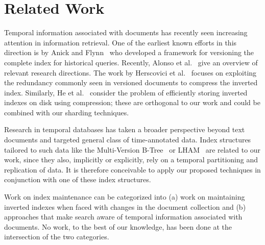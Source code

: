 

\section{Related Work}
\label{chap:sharding:sec:related}

Temporal information associated with documents has recently seen
increasing attention in information retrieval. One of the earliest
known efforts in this direction is by Anick and
Flynn~\cite{DBLP:conf/sigir/AnickF92} who developed a framework for
versioning the complete index for historical queries. Recently, Alonso
et al.~\cite{Alonso:2007aa} give an overview of relevant research
directions. The work by Herscovici et
al.~\cite{DBLP:conf/ecir/HerscoviciLY07} focuses on exploiting the
redundancy commonly seen in versioned documents to compress the
inverted index. Similarly, He et al.~\cite{DBLP:conf/cikm/HeYS09,DBLP:conf/cikm/HeZS10} consider the
problem of efficiently storing inverted indexes on disk using
compression; these are orthogonal to our work and could be combined
with our sharding techniques. 

Research in temporal databases has taken a broader perspective beyond
text documents and targeted general class of time-annotated data. 
Index structures tailored to such data like the
Multi-Version B-Tree~\cite{becker1996asymptotically} or LHAM~\cite{Muth2000} are
related to our work, since they also, implicitly or explicitly, rely
on a temporal partitioning and replication of data. It is therefore
conceivable to apply our proposed techniques in conjunction with one
of these index structures.

Work on index maintenance can be categorized into (a) work on maintaining inverted indexes when faced
with changes in the document collection and (b) approaches that make
search aware of temporal information associated with documents. No
work, to the best of our knowledge, has been done at the intersection
of the two categories.

